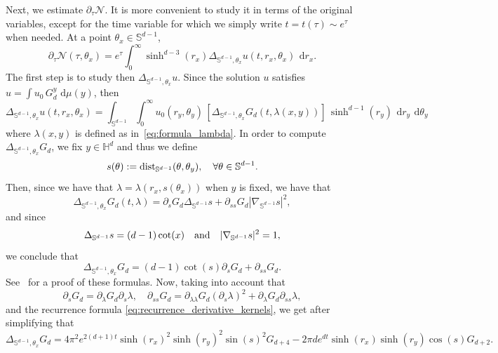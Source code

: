 \documentclass[12pt,longbibliography]{article}
\def\d{\,\mathrm{d}}
\def\d{\,\mathrm{d}}
\theoremstyle{definition}
\theoremstyle{remark}
\theoremstyle{example}
\begin{document}
Next, we estimate $\partial_\tau \mathcal{N}$. It is more convenient to study it in terms of the original variables, except for the time variable for which we simply write $t=t(\tau)\sim e^\tau$ when needed. At a point $\theta_x\in\mathbb{S}^{d-1}$,
\begin{equation}\label{eq:derivative_N_in_time}
	\partial_\tau \mathcal{N}(\tau,\theta_x) = e^\tau \int_0^\infty \sinh^{d-3}(r_x) \Delta_{\mathbb{S}^{d-1}, \theta_x} u(t,r_x, \theta_x)\ \d r_x.
\end{equation}
The first step is to study then $\Delta_{\mathbb{S}^{d-1}, \theta_x} u$.	Since the solution $u$ satisfies $u=\int u_0\, G_d^y\, \d \mu (y)$, then
\begin{equation}\label{eq:spherical_laplacian_of_u_as_a_convolution}
	\Delta_{\mathbb{S}^{d-1}, \theta_x} u(t,r_x, \theta_x) = \int_{\mathbb{S}^{d-1}}\int_{0}^\infty u_0(r_y, \theta_y)\, [\Delta_{\mathbb{S}^{d-1}, \theta_x} G_d(t,\lambda(x,y))]\, \sinh^{d-1}(r_y)\ \d r_y\ \d \theta_y
\end{equation}
where $\lambda(x,y)$ is defined as in~\eqref{eq:formula_lambda}. In order to compute $\Delta_{\mathbb{S}^{d-1}, \theta_x} G_d$, we fix $y \in \mathbb{H}^d$ and thus we define 
\[
s (\theta) := \textup{dist}_{\mathbb{S}^{d-1}} (\theta, \theta_y), \quad \forall \theta \in \mathbb{S}^{d-1}.
\]
Then, since we have that $\lambda = \lambda (r_x, s(\theta_x))$ when $y$ is fixed, we have that 
\[
\Delta_{\mathbb{S}^{d-1}, \theta_x} G_d (t, \lambda) = \partial_s G_d \Delta_{\mathbb{S}^{d-1}} s + \partial_{ss} G_d | \nabla_{\mathbb{S}^{d-1}} s|^2,
\]
and since
\[
\Delta_{\mathbb{S}^{d-1}} s = (d-1) \cot (x) \quad \textup{and} \quad | \nabla_{\mathbb{S}^{d-1}} s|^2 =1,
\]
we conclude that
\[
\Delta_{\mathbb{S}^{d-1}, \theta_x} G_d= (d-1) \cot (s) \partial_s G_d  + \partial_{ss} G_d.
\]
See~\cite{petersen2016riemannian} for a proof of these formulas. Now, taking into account that 
\[
\partial_s G_d = \partial_\lambda G_d \partial_s \lambda , \quad \partial_{ss} G_d = \partial_{\lambda \lambda} G_d (\partial_s \lambda)^2+\partial_\lambda G_d \partial_{ss} \lambda,
\]
and the recurrence formula \eqref{eq:recurrence_derivative_kernels}, we get after simplifying that
\[
\Delta_{\mathbb{S}^{d-1}, \theta_x} G_d = 4 \pi^2 e^{2(d+1)t}\sinh (r_x)^2 \sinh (r_y)^2 \sin (s)^2 G_{d+4}-2 \pi d e^{dt}\sinh (r_x) \sinh (r_y) \cos (s) G_{d+2}.
\]
\end{document}
